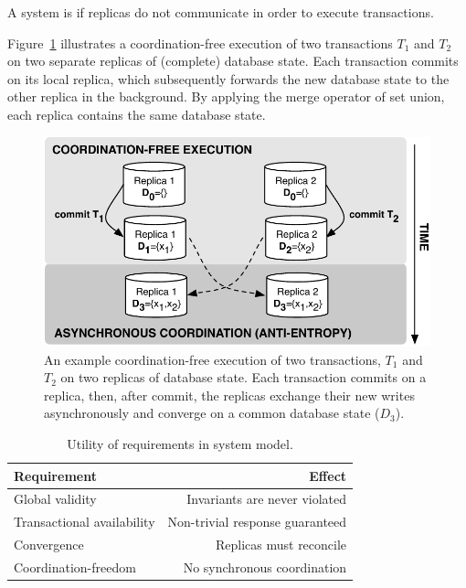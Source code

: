 \begin{definition}
A system is \textit{\cfree} if replicas do not communicate in order to
execute transactions.
\end{definition}

Figure~\ref{fig:replicas} illustrates a coordination-free execution of
two transactions $T_1$ and $T_2$ on two separate replicas of
(complete) database state. Each transaction commits on its local
replica, which subsequently forwards the new database state to the
other replica in the background. By applying the merge operator of set
union, each replica contains the same database state.

\begin{figure}
\begin{center}
\includegraphics[width=.85\columnwidth]{figs/replicas.pdf}
\end{center}\vspace{-1em}
\caption{An example coordination-free execution of two transactions,
  $T_1$ and $T_2$ on two replicas of database state. Each transaction
  commits on a replica, then, after commit, the replicas exchange
  their new writes asynchronously and converge on a common database
  state ($D_3$).}
\label{fig:replicas}
\end{figure}


\begin{table}
\begin{center}
\begin{tabular}{|l|r|}
\hline\textbf{Requirement} & \textbf{Effect}  \\\hline\hline
Global validity & Invariants are never violated \\\hline
Transactional availability & Non-trivial response guaranteed \\\hline
Convergence & Replicas must reconcile \\\hline
Coordination-freedom & No synchronous coordination\\\hline
\end{tabular}
\end{center}\vspace{-1em}
\caption{Utility of requirements in system model.}
\label{table:requirements}
\end{table}


